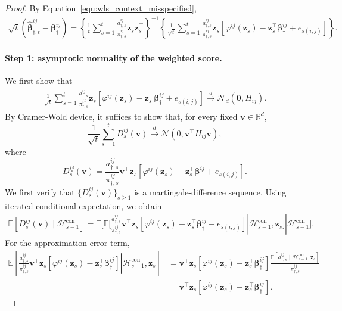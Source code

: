 \documentclass[12pt]{article}
\begin{document}
\begin{proof} 
\label{app:conthm:wls_normality_misspecified_proof}
By Equation~\eqref{equ:wls_context_misspecified}, 
\begin{align} 
\label{equ:wls_normality_decomposition} 
\sqrt t \left( \widehat{\bm\beta}_{\dagger,t}^{ij} - \bm\beta_\dagger^{ij} \right) = \left\{ \frac{1}{t} \sum_{s=1}^t \frac{ a_{\dagger,s}^{ij} }{ \pi_{\dagger,s}^{ij} } \bm z_s\bm z_s^\top \right\}^{-1} \left\{ \frac{1}{\sqrt t} \sum_{s=1}^t \frac{ a_{\dagger,s}^{ij} }{ \pi_{\dagger,s}^{ij} } \bm z_s \left[ \varphi^{ij}(\bm z_s) - \bm z_s^\top\bm\beta_\dagger^{ij} + e_{s(i,j)} \right] \right\}. 
\end{align} 

\paragraph{Step 1: asymptotic normality of the weighted score.}
We first show that 
\begin{align} 
\label{equ:wls_weighted_score_clt} 
\frac{1}{\sqrt t} \sum_{s=1}^t \frac{ a_{\dagger,s}^{ij} }{ \pi_{\dagger,s}^{ij} } \bm z_s \left[ \varphi^{ij}(\bm z_s) - \bm z_s^\top\bm\beta_\dagger^{ij} + e_{s(i,j)} \right] \stackrel{d}{\to} \mathcal N_d \left( \bm 0, H_{ij} \right). 
\end{align} 
By Cramer-Wold device, it suffices to show that, for every fixed $\bm v\in\mathbb R^d$, 
\[ 
\frac{1}{\sqrt t} \sum_{s=1}^t D_{s}^{ij}(\bm v) \stackrel{d}{\to} \mathcal N \left( 0, \bm v^\top H_{ij}\bm v \right), 
\] 
where 
\[ 
D_s^{ij}(\bm v) = \frac{ a_{\dagger,s}^{ij} }{ \pi_{\dagger,s}^{ij} } \bm v^\top\bm z_s \left[ \varphi^{ij}(\bm z_s) - \bm z_s^\top\bm\beta_\dagger^{ij} + e_{s(i,j)} \right]. 
\] 
We first verify that $\{D_s^{ij}(\bm v)\}_{s\ge1}$ is a martingale-difference sequence. Using iterated conditional expectation, we obtain 
\begin{align*} 
\mathbb E \left[ D_s^{ij}(\bm v) \mid \mathcal H_{s-1}^{\mathrm{con}} \right] = \mathbb E \Bigg[ \left. \mathbb E \Bigg[ \left. \frac{ a_{\dagger,s}^{ij} }{ \pi_{\dagger,s}^{ij} } \bm v^\top\bm z_s \left[ \varphi^{ij}(\bm z_s) - \bm z_s^\top\bm\beta_\dagger^{ij} + e_{s(i,j)} \right] \right| \mathcal H_{s-1}^{\mathrm{con}}, \bm z_s \Bigg] \right| \mathcal H_{s-1}^{\mathrm{con}} \Bigg]. 
\end{align*} 
For the approximation-error term, 
\begin{align*} 
\mathbb E \left[ \left. \frac{ a_{\dagger,s}^{ij} }{ \pi_{\dagger,s}^{ij} } \bm v^\top\bm z_s \left[ \varphi^{ij}(\bm z_s) - \bm z_s^\top\bm\beta_\dagger^{ij} \right] \right| \mathcal H_{s-1}^{\mathrm{con}}, \bm z_s \right] &= \bm v^\top\bm z_s \left[ \varphi^{ij}(\bm z_s) - \bm z_s^\top\bm\beta_\dagger^{ij} \right] \frac{ \mathbb E \left[ a_{\dagger,s}^{ij} \mid \mathcal H_{s-1}^{\mathrm{con}}, \bm z_s \right] }{ \pi_{\dagger,s}^{ij} } \\ &= \bm v^\top\bm z_s \left[ \varphi^{ij}(\bm z_s) - \bm z_s^\top\bm\beta_\dagger^{ij} \right]. 

\end{align*}
\end{proof}
\end{document}
